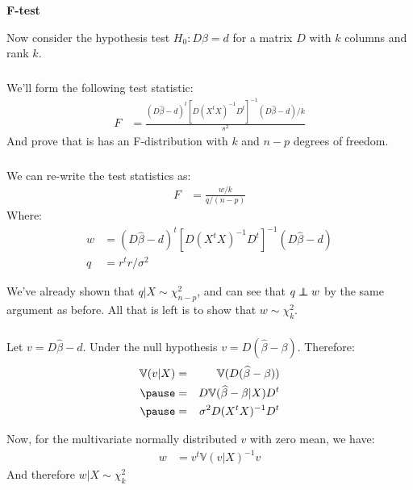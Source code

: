 \begin{frame}[fragile] \frametitle{}

{\bf F-test}

Now consider the hypothesis test $H_0: D\beta = d$ for a
matrix $D$ with $k$ columns and rank $k$.

\end{frame}

\begin{frame}[fragile] \frametitle{}

We'll form the following test statistic:
\begin{align*}
F &= \frac{(D\widehat{\beta} - d)^t [D (X^t X)^{-1} D^t ]^{-1} (D\widehat{\beta} - d) / k}{s^2}
\end{align*}
And prove that is has an F-distribution with $k$ and $n-p$ degrees of
freedom.

\end{frame}

\begin{frame}[fragile] \frametitle{}

We can re-write the test statistics as:
\begin{align*}
F &= \frac{w / k}{q / (n - p)}
\end{align*}
Where:
\begin{align*}
w &= (D\widehat{\beta} - d)^t [D (X^t X)^{-1} D^t ]^{-1} (D\widehat{\beta} - d) \\
q &= r^t r / \sigma^2
\end{align*}

\pause
We've already shown that $q | X \sim \chi^2_{n-p}$, and can see
that $q \independent w$ by the same argument as before. All that
is left is to show that $w \sim \chi^2_{k}$.

\end{frame}

\begin{frame}[fragile] \frametitle{}

Let $v = D\widehat{\beta} - d$. Under the null hypothesis $v = D (\widehat{\beta} - \beta)$.
Therefore:
\begin{eqnarray*}
\mathbb{V} (v | X) &=& \mathbb{V} (D (\widehat{\beta} - \beta)) \\ \pause
&=& D \mathbb{V} (\widehat{\beta} - \beta | X) D^t \\ \pause
&=& \sigma^2 D (X^t X)^{-1} D^t
\end{eqnarray*}

\pause
Now, for the multivariate normally distributed $v$ with zero mean,
we have:
\begin{align*}
w &= v^t \mathbb{V} (v | X)^{-1} v
\end{align*}
And therefore $w | X \sim \chi^2_k$

\end{frame}

